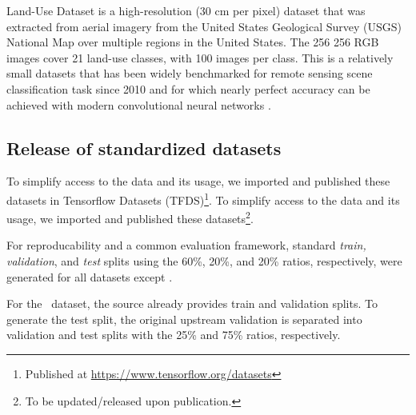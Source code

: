 {\bf \ucm{}} Land-Use Dataset \citep{yang2010:ucmerced} is a high-resolution (30 cm per pixel) dataset that was extracted from aerial imagery from the United States Geological Survey (USGS) National Map over multiple regions in the United States.
The 256  256 RGB images cover 21 land-use classes, with  100 images per class. 
This is a relatively small datasets that has been widely benchmarked for remote sensing scene classification task since 2010 and for which nearly perfect accuracy can be achieved with modern convolutional neural networks \citep{castelluccio2015, marmanis2016, nogueira2016:cnn}.





\subsection{Release of standardized datasets}




\iffinal
To simplify access to the data and its usage, we imported and published these datasets in 
Tensorflow Datasets (TFDS)\footnote{Published at \url{https://www.tensorflow.org/datasets}}.
\else
To simplify access to the data and its usage, we imported and published these datasets\footnote{To be updated/released upon publication.}.
\fi



For reproducability and a common evaluation framework, standard \emph{train, validation}, and \emph{test} splits using the 60\%, 20\%, and 20\% ratios, respectively, were generated for all datasets except \sos.

For the \sos\ dataset, the source already provides train and validation splits. To generate the test split, the original upstream validation is separated into validation and test splits with the 25\% and 75\% ratios, respectively.














